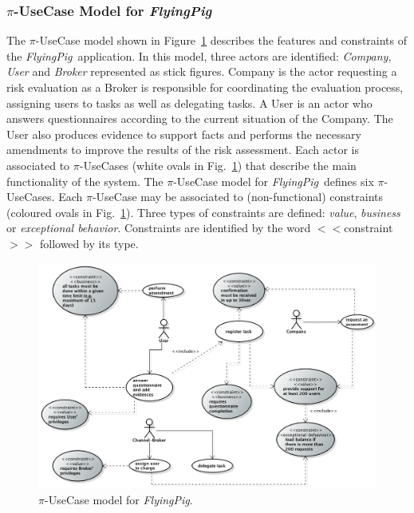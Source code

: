 \documentclass{singlecol-new}
\theoremstyle{TH}{
\newtheorem{lemma}{Lemma}
\newtheorem{theorem}[lemma]{Theorem}
\newtheorem{corrolary}[lemma]{Corrolary}
\newtheorem{conjecture}[lemma]{Conjecture}
\newtheorem{proposition}[lemma]{Proposition}
\newtheorem{claim}[lemma]{Claim}
\newtheorem{stheorem}[lemma]{Wrong Theorem}
\newtheorem{algorithm}{Algorithm}
}
\theoremstyle{THrm}{
\newtheorem{definition}{Definition}[section]
\newtheorem{question}{Question}[section]
\newtheorem{remark}{Remark}
\newtheorem{scheme}{Scheme}
}
\theoremstyle{THhit}{
\newtheorem{case}{Case}[section]
}
\theoremstyle{THhsl}{
\newtheorem{example}{Example}
}
\def\FlyingPig{\textsl{FlyingPig}\xspace}
\begin{document}
\subsubsection{$\pi$-UseCase Model for \FlyingPig}

The $\pi$-UseCase model shown in Figure~\ref{fig:piUseCaseModel} describes the features and constraints of the \FlyingPig\ application.
In this model, three actors are identified: \textit{Company}, \textit{User} and \textit {Broker} represented as stick figures.
Company is the actor requesting a risk evaluation as a Broker is  responsible for coordinating  the evaluation process, assigning users to tasks as well as delegating tasks.
A User is an actor who answers questionnaires according to the current situation  of the Company.
The User also produces evidence to support facts and performs the necessary amendments to improve the results of the risk assessment.
Each actor is associated to $\pi$-UseCases (white ovals in Fig.~\ref{fig:piUseCaseModel})
that describe the main functionality of the system.
The $\pi$-UseCase model for \FlyingPig\ defines six $\pi$-UseCases.
Each $\pi$-UseCase may be associated to (non-functional) constraints (coloured ovals in Fig.~\ref{fig:piUseCaseModel}).%
Three types of constraints are defined: \textit{value}, \textit{business} or \textit{exceptional behavior}.
Constraints are identified by the word $<<$\textsf{constraint}$>>$ followed by its type.

\begin{figure}[h]
\centering
\includegraphics[width=1\textwidth]{./figures/UseCaseGeneral.png}
\caption{$\pi$-UseCase model for \FlyingPig.\label{fig:piUseCaseModel}}
\end{figure}
\end{document}
